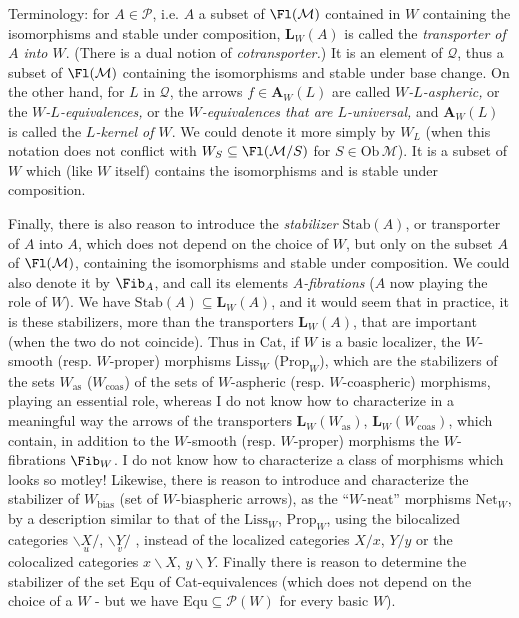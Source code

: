 Terminology: for $A \in \mathcal{P}$, i.e. $A$ a subset of $\Fl(\mathcal{M})$ contained in $W$ containing the isomorphisms and stable under composition, $\mathbf{L}_W(A)$ is called the \textit{transporter of $A$ into $W$}. (There is a dual notion of \textit{cotransporter.}) It is an element of $\mathcal{Q}$, thus a subset of $\Fl(\mathcal{M})$ containing the isomorphisms and stable under base change. On the other hand, for $L$ in $\mathcal{Q}$, the arrows $f \in \mathbf{A}_W(L)$ are called \textit{$W$-$L$-aspheric,} or the \textit{$W$-$L$-equivalences,} or the \textit{$W$-equivalences that are $L$-universal,} and $\mathbf{A}_W(L)$ is called the \textit{$L$-kernel of $W$}. We could denote it more simply by $W_L$ (when this notation does not conflict with $W_S \subseteq \Fl(\mathcal{M}/S)$ for $S \in \mathrm{Ob}\,\mathcal{M}$). It is a subset of $W$ which (like $W$ itself) contains the isomorphisms and is stable under composition. %

Finally, there is also reason to introduce the \textit{stabilizer} $\mathrm{Stab}(A)$, or transporter of $A$ into $A$, which does not depend on the choice of $W$, but only on the subset $A$ of $\Fl(\mathcal{M})$, containing the isomorphisms and stable under composition. We could also denote it by $\Fib_A$, and call its elements \textit{$A$-fibrations} ($A$ now playing the role of $W$). We have $\mathrm{Stab}(A) \subseteq \mathbf{L}_W(A)$, and it would seem that in %
practice, it is these stabilizers, more than the transporters $\mathbf{L}_W(A)$, that are important (when the two do not coincide). Thus in Cat, if $W$ is a basic localizer, the $W$-smooth (resp. $W$-proper) morphisms $\mathrm{Liss}_W$ ($\mathrm{Prop}_W$), which are the stabilizers of the sets $W_{\mathrm{as}}$ ($W_{\mathrm{coas}}$) of the sets of $W$-aspheric (resp. $W$-coaspheric) morphisms, playing an essential role, whereas I do not know how to characterize in a meaningful way the arrows of the transporters $\mathbf{L}_W(W_{\mathrm{as}})$, $\mathbf{L}_W(W_{\mathrm{coas}})$, which contain, in addition to the $W$-smooth (resp. $W$-proper) morphisms the $W$-fibrations $\Fib_W$. I do not know how to characterize a class of morphisms which looks so motley! Likewise, there is reason to introduce and characterize the stabilizer of $W_{\mathrm{bias}}$ (set of $W$-biaspheric arrows), as the ``$W$-neat'' morphisms $\mathrm{Net}_W$, by a description similar to that of the $\mathrm{Liss}_W$, $\mathrm{Prop}_W$, using the bilocalized categories $\backslash\underset{u}{X}/$, $\backslash\underset{v}{Y}/$ , instead of the localized categories $X/x$, $Y/y$ or the colocalized categories $x\backslash X$, $y\backslash Y$. Finally there is reason to determine the stabilizer of the set Equ of Cat-equivalences (which does not depend on the choice of a $W$ - but we have $\mathrm{Equ} \subseteq \mathcal{P}(W)$ for every basic $W$). %

